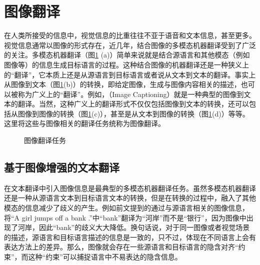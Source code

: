 \sectionnewpage
\section{图像翻译}

\parinterval 在人类所接受的信息中，视觉信息的比重往往不亚于语音和文本信息，甚至更多。视觉信息通常以图像的形式存在，近几年，结合图像的多模态机器翻译受到了广泛的关注。多模态机器翻译（图\ref{fig:17-11} (a)）简单来说就是结合源语言和其他模态（例如图像等）的信息生成目标语言的过程。这种结合图像的机器翻译还是一种狭义上的“翻译”，它本质上还是从源语言到目标语言或者说从文本到文本的翻译。事实上从图像到文本（图\ref{fig:17-11}(b)）的转换，即给定图像，生成与图像内容相关的描述，也可以被称为广义上的“翻译”。例如，{\small{}}（Image Captioning）就是一种典型的图像到文本的翻译。当然，这种广义上的翻译形式不仅仅包括图像到文本的转换，还可以包括从图像到图像的转换（图\ref{fig:17-11}(c)），甚至是从文本到图像的转换（图\ref{fig:17-11}(d)）等等。这里将这些与图像相关的翻译任务统称为图像翻译。

\begin{figure}[htp]
\centering

\caption{图像翻译任务}
\label{fig:17-11}
\end{figure}


\subsection{基于图像增强的文本翻译}
\label{sec:image-augmented-translation}

\parinterval 在文本翻译中引入图像信息是最典型的多模态机器翻译任务。虽然多模态机器翻译还是一种从源语言文本到目标语言文本的转换，但是在转换的过程中，融入了其他模态的信息减少了歧义的产生。例如前文提到的通过与源语言相关的图像信息，将“A girl jumps off a bank .”中“bank”翻译为“河岸”而不是“银行”，因为图像中出现了河岸，因此“bank”的歧义大大降低。换句话说，对于同一图像或者视觉场景的描述，源语言和目标语言描述的信息是一致的，只不过，体现在不同语言上会有表达方法上的差异。那么，图像就会存在一些源语言和目标语言的隐含对齐“约束”，而这种“约束”可以捕捉语言中不易表达的隐含信息。


